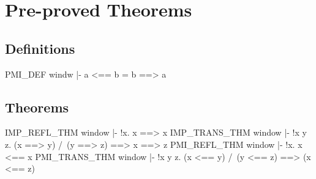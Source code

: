 \chapter{Pre-proved Theorems}

\section{Definitions}
\THEOREM PMI\_DEF windw
|- a <== b = b ==> a
\ENDTHEOREM
\section{Theorems}
\THEOREM IMP\_REFL\_THM window
|- !x. x ==> x
\ENDTHEOREM
\THEOREM IMP\_TRANS\_THM window
|- !x y z. (x ==> y) /\ (y ==> z) ==> x ==> z
\ENDTHEOREM
\THEOREM PMI\_REFL\_THM window
|- !x. x <== x
\ENDTHEOREM
\THEOREM PMI\_TRANS\_THM window
|- !x y z. (x <== y) /\ (y <== z) ==> (x <== z)
\ENDTHEOREM
